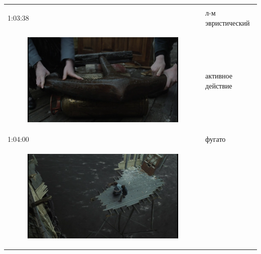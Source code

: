 \begin{longtable}[]{@{}ll@{}}
\begin{minipage}[t]{0.31\columnwidth}
\end{minipage}\tabularnewline
\begin{minipage}[t]{0.39\columnwidth}\raggedright\strut
1:03:38\strut
\end{minipage} & \begin{minipage}[t]{0.31\columnwidth}\raggedright\strut
л-м эвристический\strut
\end{minipage}\tabularnewline
\begin{minipage}[t]{0.39\columnwidth}\raggedright\strut
\begin{figure}
\centering
\includegraphics{IMG/LS_HH_fugato.png}
\caption{}
\end{figure}
\strut
\end{minipage} & \begin{minipage}[t]{0.31\columnwidth}\raggedright\strut
активное действие\strut
\end{minipage}\tabularnewline
\begin{minipage}[t]{0.39\columnwidth}\raggedright\strut
1:04:00\strut
\end{minipage} & \begin{minipage}[t]{0.31\columnwidth}\raggedright\strut
фугато\strut
\end{minipage}\tabularnewline
\begin{minipage}[t]{0.39\columnwidth}\raggedright\strut
\begin{figure}
\centering
\includegraphics{IMG/LS_HH_suspense.png}

\end{figure}
\end{minipage}
\end{longtable}
